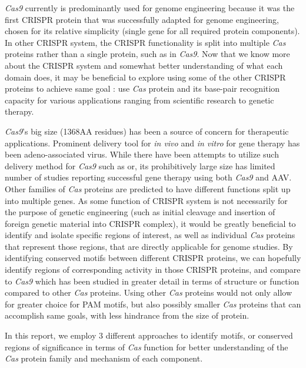\documentclass[11pt, oneside]{article}
\begin{document}
\textit{Cas9} currently is predominantly used for genome engineering because it was the first CRISPR protein that was successfully adapted for genome engineering, chosen for its relative simplicity (single gene for all required protein components). In other CRISPR system, the CRISPR functionality is split into multiple \textit{Cas} proteins rather than a single protein, such as in \textit{Cas9}. Now that we know more about the CRISPR system and somewhat better understanding of what each domain does, it may be beneficial to explore using some of the other CRISPR proteins to achieve same goal : use \textit{Cas} protein and its base-pair recognition capacity for various applications ranging from scientific research to genetic therapy. 

\textit{Cas9}'s big size (1368AA residues) has been a source of concern for therapeutic applications.  Prominent delivery tool for \textit{in vivo} and \textit{in vitro} for gene therapy has been adeno-associated virus. While there have been attempts to utilize such delivery method for \textit{Cas9} such as \cite{aav1} or\cite{aav2}, its prohibitively large size has limited number of studies reporting successful gene therapy using both \textit{Cas9} and AAV. Other families of \textit{Cas} proteins are predicted to have different functions split up into multiple genes. As some function of CRISPR system is not necessarily for the purpose of genetic engineering (such as initial cleavage and insertion of foreign genetic material into CRISPR complex), it would be greatly beneficial to identify and isolate specific regions of interest, as well as individual \textit{Cas} proteins that represent those regions, that are directly applicable for genome studies. By identifying conserved motifs between different CRISPR proteins, we can hopefully identify regions of corresponding activity in those CRISPR proteins, and compare to \textit{Cas9} which has been studied in greater detail in terms of structure\cite{cas9structure} or function\cite{mali} compared to other \textit{Cas} proteins. Using other \textit{Cas} proteins would not only allow for greater choice for PAM motifs, but also possibly smaller \textit{Cas} proteins that can accomplish same goals, with less hindrance from the size of protein.

In this report, we employ 3 different approaches to identify motifs, or conserved regions of significance in terms of \textit{Cas} function for better understanding of the \textit{Cas} protein family and mechanism of each component. 
\end{document}
